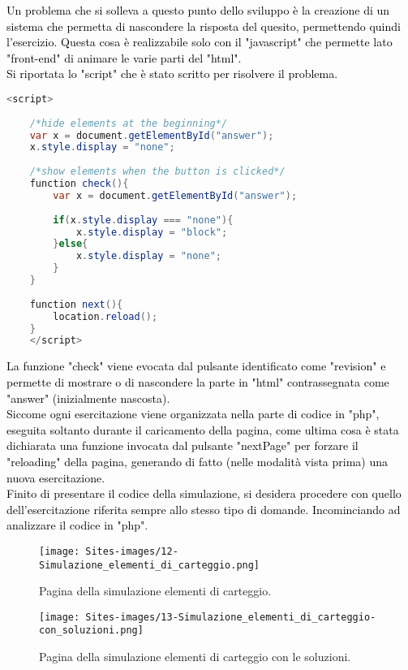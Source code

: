 \textcolor{black}{Un problema che si solleva a questo punto dello sviluppo è la creazione di un sistema che permetta di nascondere la risposta del quesito, permettendo quindi l'esercizio. Questa cosa è realizzabile solo con il "javascript" che permette lato "front-end" di animare le varie parti del "html".\\
Si riportata lo "script" che è stato scritto per risolvere il problema.}\\

\begin{lstlisting}[language=java]
	<script>
	
	/*hide elements at the beginning*/
	var x = document.getElementById("answer");
	x.style.display = "none";
	
	/*show elements when the button is clicked*/
	function check(){
		var x = document.getElementById("answer");
		
		if(x.style.display === "none"){
			x.style.display = "block";
		}else{
			x.style.display = "none";
		}	
	}
	
	function next(){
		location.reload();  
	}
	</script>
\end{lstlisting}

\textcolor{black}{La funzione "check" viene evocata dal pulsante identificato come "revision" e permette di mostrare o di nascondere la parte in "html" contrassegnata come "answer" (inizialmente nascosta).\\
Siccome ogni esercitazione viene organizzata nella parte di codice in "php", eseguita soltanto durante il caricamento della pagina, come ultima cosa è stata dichiarata una funzione invocata dal pulsante "nextPage" per forzare il "reloading" della pagina, generando di fatto (nelle modalità vista prima) una nuova esercitazione.}\\
\bigskip
\textcolor{black}{Finito di presentare il codice della simulazione, si desidera procedere con quello dell'esercitazione riferita sempre allo stesso tipo di domande. Incominciando ad analizzare il codice in "php"}.

\begin{figure}[h]
	\begin{center}
		\texttt{[image: Sites-images/12-Simulazione\_elementi\_di\_carteggio.png]}
		\caption{Pagina della simulazione elementi di carteggio.}
	\end{center}
\end{figure}

\begin{figure}[h]
	\begin{center}
		\texttt{[image: Sites-images/13-Simulazione\_elementi\_di\_carteggio-con\_soluzioni.png]}
		\caption{Pagina della simulazione elementi di carteggio con le soluzioni.}
	\end{center}
\end{figure}

